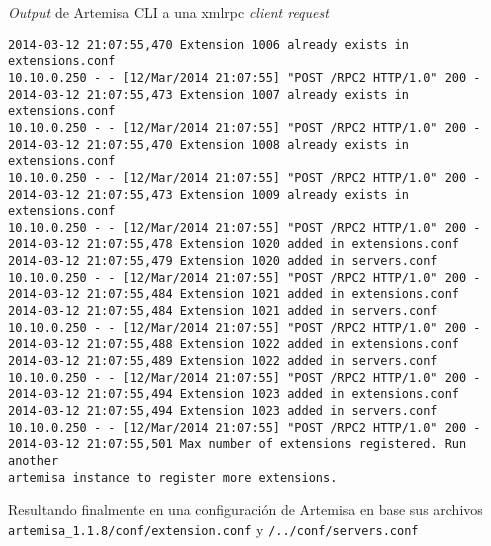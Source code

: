 \documentclass[a4paper,12pt]{report}
\newenvironment{myscriptlisting}
{\begin{list}{}{\setlength{\leftmargin}{1em}}\item\scriptsize\bfseries}
{\end{list}}
\begin{document}
\emph{Output} de Artemisa CLI a una \ac{xmlrpc} \emph{client request}
\begin{myscriptlisting}   
  \begin{verbatim}
2014-03-12 21:07:55,470 Extension 1006 already exists in extensions.conf
10.10.0.250 - - [12/Mar/2014 21:07:55] "POST /RPC2 HTTP/1.0" 200 -
2014-03-12 21:07:55,473 Extension 1007 already exists in extensions.conf
10.10.0.250 - - [12/Mar/2014 21:07:55] "POST /RPC2 HTTP/1.0" 200 -
2014-03-12 21:07:55,470 Extension 1008 already exists in extensions.conf
10.10.0.250 - - [12/Mar/2014 21:07:55] "POST /RPC2 HTTP/1.0" 200 -
2014-03-12 21:07:55,473 Extension 1009 already exists in extensions.conf
10.10.0.250 - - [12/Mar/2014 21:07:55] "POST /RPC2 HTTP/1.0" 200 -
2014-03-12 21:07:55,478 Extension 1020 added in extensions.conf
2014-03-12 21:07:55,479 Extension 1020 added in servers.conf
10.10.0.250 - - [12/Mar/2014 21:07:55] "POST /RPC2 HTTP/1.0" 200 -
2014-03-12 21:07:55,484 Extension 1021 added in extensions.conf
2014-03-12 21:07:55,484 Extension 1021 added in servers.conf
10.10.0.250 - - [12/Mar/2014 21:07:55] "POST /RPC2 HTTP/1.0" 200 -
2014-03-12 21:07:55,488 Extension 1022 added in extensions.conf
2014-03-12 21:07:55,489 Extension 1022 added in servers.conf
10.10.0.250 - - [12/Mar/2014 21:07:55] "POST /RPC2 HTTP/1.0" 200 -
2014-03-12 21:07:55,494 Extension 1023 added in extensions.conf
2014-03-12 21:07:55,494 Extension 1023 added in servers.conf
10.10.0.250 - - [12/Mar/2014 21:07:55] "POST /RPC2 HTTP/1.0" 200 -
2014-03-12 21:07:55,501 Max number of extensions registered. Run another
artemisa instance to register more extensions.
  \end{verbatim}
\end{myscriptlisting}

Resultando finalmente en una configuración de Artemisa en base sus
archivos \\
\texttt{artemisa\_1.1.8/conf/extension.conf} y \texttt{/../conf/servers.conf}\\
\end{document}

